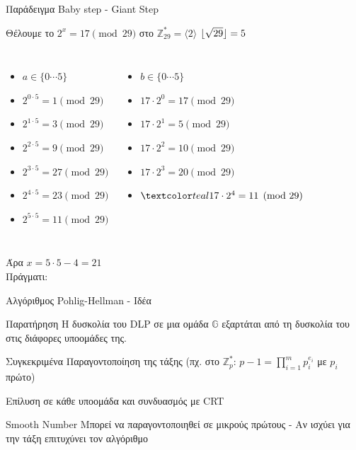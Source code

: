\documentclass[handout]{beamer}
\DeclarePairedDelimiter\floor{\lfloor}{\rfloor}
\begin{document}
\begin{frame}{Παράδειγμα Baby step - Giant Step}
\begin{block}{Θέλουμε το $2^x = 17 \pmod{29}$ στο $\mathbb{Z}_{29}^*=\langle 2 \rangle$}
$\floor{\sqrt{29}} = 5$
\pause
\begin{columns}
\begin{itemize}
\item $a \in \{0 \cdots 5 \}$
\item $2^{0 \cdot 5} = 1  \pmod{29}$
\pause
\item $2^{1 \cdot 5} = 3  \pmod{29}$
\pause
\item $2^{2 \cdot 5} = 9  \pmod{29}$
\pause
\item $2^{3 \cdot 5} = 27  \pmod{29}$
\pause
\item $2^{4 \cdot 5} = 23  \pmod{29}$
\pause
\item $2^{5 \cdot 5} = 11  \pmod{29}$
\end{itemize}
\pause
{}

\begin{itemize}
\item $b \in \{0 \cdots 5 \}$
\item $17 \cdot 2^{0} = 17  \pmod{29}$
\pause
\item $17 \cdot 2^{1} = 5  \pmod{29}$
\pause
\item $17 \cdot 2^{2} = 10  \pmod{29}$
\pause
\item $17 \cdot 2^{3} = 20  \pmod{29}$
\pause
\item $\green{17 \cdot 2^{4} = 11  \pmod{29}}$
\end{itemize}
\end{columns}
\pause
\begin{center}
Άρα $x = 5 \cdot 5 - 4 = 21$\\
Πράγματι: 
\end{center}
\end{block}

\end{frame}

\begin{frame}{Αλγόριθμος Pohlig-Hellman - Ιδέα}

\begin{block}{Παρατήρηση}
Η δυσκολία του DLP σε μια ομάδα $\mathbb{G}$ εξαρτάται από τη δυσκολία του στις διάφορες υποομάδες της.
\end{block}
\pause
\begin{block}{Συγκεκριμένα}
Παραγοντοποίηση της τάξης (πχ. στο $\mathbb{Z}_p^*$: $p-1 = \prod_{i=1}^m p_i^{e_i}$ με $p_i$ πρώτο)

Επίλυση σε κάθε υποομάδα και συνδυασμός με CRT 
\end{block}
\pause
\begin{block}{Smooth Number}
Μπορεί να παραγοντοποιηθεί σε μικρούς πρώτους - Αν ισχύει για την τάξη επιτυχύνει τον αλγόριθμο
\end{block}
\end{frame}
\end{document}
